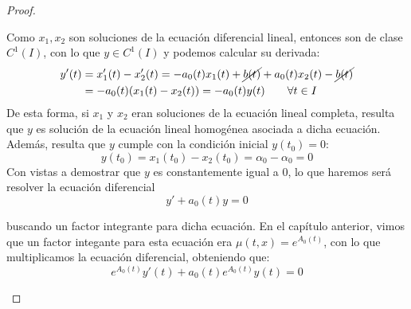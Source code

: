 \begin{prop}
\begin{proof}
\begin{description}
                Como $x_1,x_2$ son soluciones de la ecuación diferencial lineal, entonces son de clase $C^1(I)$, con lo que $y\in C^1(I)$ y podemos calcular su derivada:
                \begin{align*}
                    y'(t) &= x_1'(t) - x_2'(t) = -a_0(t)x_1(t) + \cancel{b(t)} + a_0(t)x_2(t) - \cancel{b(t)} \\
                          &= -a_0(t) (x_1(t) - x_2(t)) = -a_0(t)y(t) \qquad \forall t\in I
                \end{align*}
                De esta forma, si $x_1$ y $x_2$ eran soluciones de la ecuación lineal completa, resulta que $y$ es solución de la ecuación lineal homogénea asociada a dicha ecuación.\\

                Además, resulta que $y$ cumple con la condición inicial $y(t_0) = 0$:
                \begin{equation*}
                    y(t_0) = x_1(t_0) - x_2(t_0) = \alpha_0 - \alpha_0 = 0
                \end{equation*}
                Con vistas a demostrar que $y$ es constantemente igual a 0, lo que haremos será resolver la ecuación diferencial 
                \begin{equation*}
                    y' + a_0(t) y = 0
                \end{equation*}

                buscando un factor integrante para dicha ecuación. En el capítulo anterior, vimos que un factor integante para esta ecuación era $\mu(t,x) = e^{A_0(t)}$, con lo que multiplicamos la ecuación diferencial, obteniendo que:
                \begin{equation*}
                    e^{A_0(t)}y'(t) + a_0(t)e^{A_0(t)}y(t) = 0
                \end{equation*}


\end{description}
\end{proof}
\end{prop}
